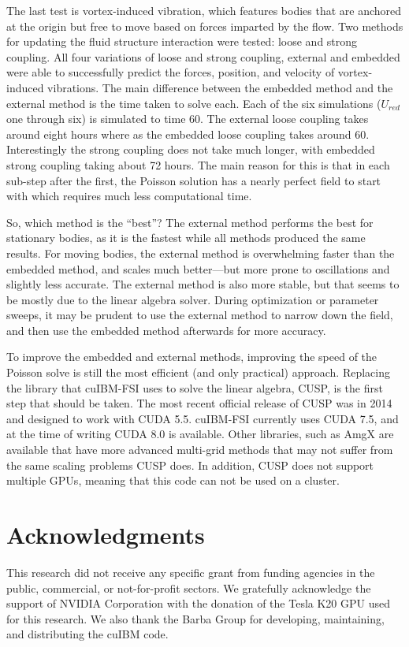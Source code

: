 \documentclass[preprint,12pt]{elsarticle}
\begin{document}
The last test is vortex-induced vibration, which features bodies that are anchored at the origin but free to move based on forces imparted by the flow.
Two methods for updating the fluid structure interaction were tested: loose and strong coupling.
All four variations of loose and strong coupling, external and embedded were able to successfully predict the forces, position, and velocity of vortex-induced vibrations.
The main difference between the embedded method and the external method is the time taken to solve each.
Each of the six simulations ($U_{red}$ one through six) is simulated to time 60.
The external loose coupling takes around eight hours where as the embedded loose coupling takes around 60.
Interestingly the strong coupling does not take much longer, with embedded strong coupling taking about 72 hours.
The main reason for this is that in each sub-step after the first, the Poisson solution has a nearly perfect field to start with which requires much less computational time.

So, which method is the ``best''?
The external method performs the best for stationary bodies, as it is the fastest while all methods produced the same results.
For moving bodies, the external method is overwhelming faster than the embedded method, and scales much better---but more prone to oscillations and slightly less accurate.
The external method is also more stable, but that seems to be mostly due to the linear algebra solver.
During optimization or parameter sweeps, it may be prudent to use the external method to narrow down the field, and then use the embedded method afterwards for more accuracy.

To improve the embedded and external methods, improving the speed of the Poisson solve is still the most efficient (and only practical) approach.
Replacing the library that cuIBM-FSI uses to solve the linear algebra, CUSP, is the first step that should be taken.
The most recent official release of CUSP was in 2014 and designed to work with CUDA 5.5.
cuIBM-FSI currently uses CUDA 7.5, and at the time of writing CUDA 8.0 is available.
Other libraries, such as AmgX are available that have more advanced multi-grid methods that may not suffer from the same scaling problems CUSP does.
In addition, CUSP does not support multiple GPUs, meaning that this code can not be used on a cluster.

\section*{Acknowledgments}
This research did not receive any specific grant from funding agencies in the public, commercial, or not-for-profit sectors.
We gratefully acknowledge the support of NVIDIA Corporation with the donation of the Tesla K20 GPU used for this research.
We also thank the Barba Group for developing, maintaining, and distributing the cuIBM code.
\end{document}
